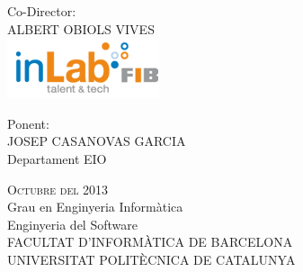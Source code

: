 \begin{titlepage}
\begin{center}
\begin{minipage}{0.30\textwidth}
\begin{flushleft}
        \end{flushleft}
    \end{minipage}
    \begin{minipage}{0.30\textwidth}
        \begin{flushleft}
            Co-Director:                                                \\[0.6\baselineskip]
            ALBERT OBIOLS VIVES                                         \\[0.6\baselineskip]
            \includegraphics[scale=0.4]{NotDef/logo_inlab.png}          \\
        \end{flushleft}
    \end{minipage}
    \begin{minipage}{0.30\textwidth}
        \begin{flushleft} 
            Ponent:                                                     \\[1\baselineskip]
            JOSEP CASANOVAS GARCIA                                      \\[1\baselineskip]
            \small{Departament EIO}                                     \\[0.7\baselineskip]
        \end{flushleft}
    \end{minipage}
    \vfill
    {\huge\scshape Octubre del 2013}                                     \\[2.0\baselineskip]
    {\large Grau en Enginyeria Informàtica}                             \\[0.3\baselineskip]
    {\large Enginyeria del Software}                                    \\[1.5\baselineskip]
    {\large FACULTAT D'INFORMÀTICA DE BARCELONA}                        \\[0.3\baselineskip]
    {\large UNIVERSITAT POLITÈCNICA DE CATALUNYA}
\end{center}
\end{titlepage}

\setlength{\parskip}{12pt}

\tableofcontents

\newpage

\newpage


\newpage

\newpage


\newpage
   
\newpage

\newpage
   


